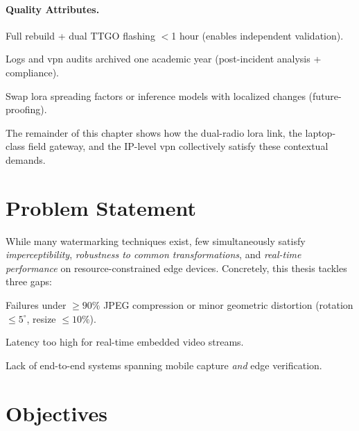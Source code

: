 \paragraph{\textbf{Quality Attributes.}}
\begin{description}[leftmargin=3.2cm,style=sameline]
    \item[\textbf{Reproducibility}] Full rebuild + dual TTGO flashing $<$1 hour (enables independent validation).
    \item[\textbf{Traceability}] Logs and \gls{vpn} audits archived one academic year (post-incident analysis + compliance).
    \item[\textbf{Evolvability}] Swap \gls{lora} spreading factors or inference models with localized changes (future-proofing).
\end{description}

\bigskip
The remainder of this chapter shows how the dual-radio \gls{lora} link, the
laptop-class field gateway, and the IP-level \gls{vpn} collectively satisfy
these contextual demands.

\section{Problem Statement}
\label{sec:intro:problem}

While many watermarking techniques exist, few simultaneously satisfy
\emph{imperceptibility}, \emph{robustness to common transformations},
and \emph{real-time performance} on resource-constrained edge devices.
Concretely, this thesis tackles three gaps:

\begin{description}[leftmargin=3.6cm,style=sameline]
  \item[\textbf{Robustness bottleneck}] Failures under $\ge 90\%$ JPEG compression or minor geometric distortion (rotation $\le 5^{\circ}$, resize $\le 10\%$).
  \item[\textbf{Performance gap}] Latency too high for real-time embedded video streams.
  \item[\textbf{Integration gap}] Lack of end-to-end systems spanning mobile capture \emph{and} edge verification.
\end{description}

\section{Objectives}
\label{sec:intro:objectives}

